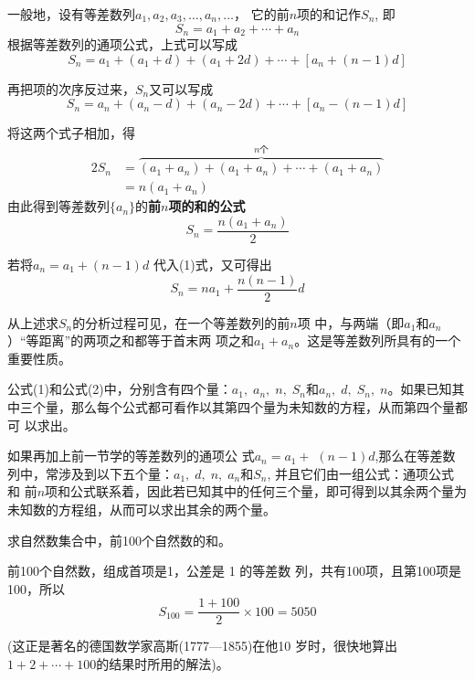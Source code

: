 一般地，设有等差数列$a_1,a_2,a_3,\ldots,a_n,\ldots$，
它的前$n$项的和记作$S_n$, 即
\[S_n=a_1+a_2+\cdots+a_n\]
根据等差数列的通项公式，上式可以写成
\[S_n=a_1+(a_1+d)+(a_1+2d)+\cdots+[a_n+(n-1)d]\]

再把项的次序反过来，$S_n$又可以写成
\[S_n=a_n+(a_n-d)+(a_n-2d)+\cdots+[a_n-(n-1)d]\]

将这两个式子相加，得
\[\begin{split}
    2S_n&=\overbrace{(a_1+a_n)+(a_1+a_n)+\cdots +(a_1+a_n)}^{n\text{个}} \\
    &=n(a_1+a_n)
\end{split}\]
由此得到等差数列$\{a_n\}$的\textbf{前$n$项的和的公式}
\begin{equation}
    S_n=\frac{n(a_1+a_n)}{2}\tag{1}
\end{equation}

若将$a_n=a_1+(n-1)d$
代入(1)式，又可得出
\begin{equation}
    S_n=na_1+\frac{n(n-1)}{2}d \tag{2}
\end{equation}

从上述求$S_n$的分析过程可见，在一个等差数列的前$n$项
中，与两端（即$a_1$和$a_n$）“等距离”的两项之和都等于首末两
项之和$a_1+a_n$。这是等差数列所具有的一个重要性质。

公式(1)和公式(2)中，分别含有四个量：$a_1,\; a_n,\;  n,\; S_n$和$a_n,\; d,\; S_n,\; n$。如果已知其中三个量，那么每个公式都可看作以其第四个量为未知数的方程，从而第四个量都可
以求出。

如果再加上前一节学的等差数列的通项公 式$a_n=a_1+$ $(n-1)d$,那么在等差数列中，常涉及到以下五个量：$a_1,\; d,\; n,\; a_n$和$S_n$, 并且它们由一组公式：通项公式 和 前$n$项和公式联系着，因此若已知其中的任何三个量，即可得到以其余两个量为未知数的方程组，从而可以求出其余的两个量。


\begin{example}
    求自然数集合中，前100个自然数的和。
\end{example}

\begin{solution}
前100个自然数，组成首项是1，公差是 1 的等差数
列，共有100项，且第100项是100，所以
$$S_{100}=\frac{1+100}2\times100=5050$$

(这正是著名的德国数学家高斯(1777—1855)在他10
岁时，很快地算出$1+2+\cdots+100$的结果时所用的解法)。 
\end{solution}









